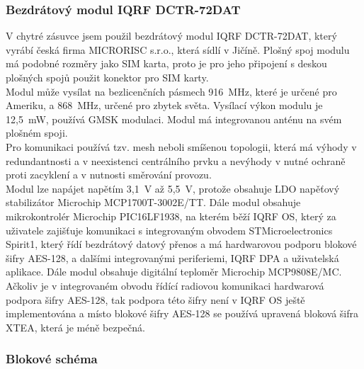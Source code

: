 \documentclass[12pt,a4paper,oneside]{article}
\begin{document}
\subsubsection{Bezdrátový modul IQRF DCTR-72DAT}

V chytré zásuvce jsem použil bezdrátový modul IQRF DCTR-72DAT, který vyrábí česká firma MICRORISC s.r.o., která sídlí v Jičíně. Plošný spoj modulu má podobné rozměry jako SIM karta, proto je pro jeho připojení s deskou plošných spojů použit konektor pro SIM karty. \\ 

Modul může vysílat na bezlicenčních pásmech 916~MHz, které je určené pro Ameriku, a 868~MHz, určené pro zbytek světa. Vysílací výkon modulu je 12,5~mW, používá GMSK modulaci. Modul má integrovanou anténu na svém plošném spoji. \\

Pro komunikaci používá tzv. mesh neboli smíšenou topologii, která má výhody v redundantnosti a v neexistenci centrálního prvku a nevýhody v nutné ochraně proti zacyklení a v nutnosti směrování provozu. \\

Modul lze napájet napětím 3,1~V až 5,5~V, protože obsahuje LDO napěťový stabilizátor Microchip  MCP1700T-3002E/TT. Dále modul obsahuje mikrokontrolér Microchip PIC16LF1938, na kterém běží IQRF OS, který za uživatele zajišťuje komunikaci s integrovaným obvodem STMicroelectronics Spirit1, který řídí bezdrátový datový přenos a má hardwarovou podporu blokové šifry AES-128, a dalšími integrovanými periferiemi, IQRF DPA a uživatelská aplikace. Dále modul obsahuje digitální teploměr Microchip MCP9808E/MC. \\ 

Ačkoliv je v integrovaném obvodu řídící radiovou komunikaci hardwarová podpora šifry AES-128, tak podpora této šifry není v IQRF OS ještě implementována a místo blokové šifry AES-128 se používá upravená bloková šifra XTEA, která je méně bezpečná.

\subsubsection{Blokové schéma}
\end{document}
